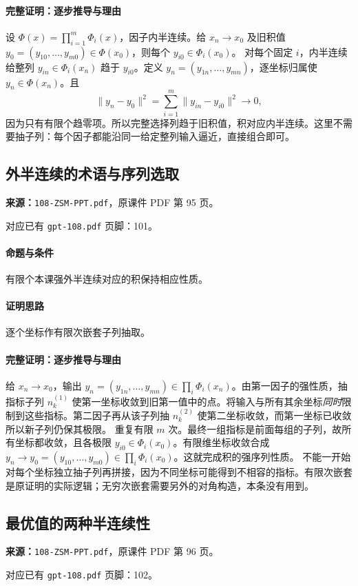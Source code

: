 \paragraph{完整证明：逐步推导与理由}

设 $\Phi(x)=\prod_{i=1}^m\Phi_i(x)$，因子内半连续。给 $x_n\to x_0$ 及旧积值 $y_0=(y_{10},\ldots,y_{m0})\in\Phi(x_0)$，则每个 $y_{i0}\in\Phi_i(x_0)$。
对每个固定 $i$，内半连续给整列 $y_{in}\in\Phi_i(x_n)$ 趋于 $y_{i0}$。定义 $y_n=(y_{1n},\ldots,y_{mn})$，逐坐标归属使 $y_n\in\Phi(x_n)$。且
\[\|y_n-y_0\|^2=\sum_{i=1}^m\|y_{in}-y_{i0}\|^2\to0,\]
因为只有有限个趋零项。所以完整选择列趋于旧积值，积对应内半连续。这里不需要抽子列：每个因子都能沿同一给定整列输入逼近，直接组合即可。

\clearpage\subsection{外半连续的术语与序列选取}
\textbf{来源：}\texttt{108-ZSM-PPT.pdf}，原课件 PDF 第 95 页。\par
对应已有 \texttt{gpt-108.pdf} 页脚：101。\par
\paragraph{命题与条件}有限个本课强外半连续对应的积保持相应性质。
\paragraph{证明思路}逐个坐标作有限次嵌套子列抽取。
\paragraph{完整证明：逐步推导与理由}

给 $x_n\to x_0$，输出 $y_n=(y_{1n},\ldots,y_{mn})\in\prod_i\Phi_i(x_n)$。由第一因子的强性质，抽指标子列 $n^{(1)}_k$ 使第一坐标收敛到旧第一值中的点。将输入与所有其余坐标\emph{同时}限制到这些指标。第二因子再从该子列抽 $n^{(2)}_k$ 使第二坐标收敛，而第一坐标已收敛所以新子列仍保其极限。
重复有限 $m$ 次。最终一组指标是前面每组的子列，故所有坐标都收敛，且各极限 $y_{i0}\in\Phi_i(x_0)$。有限维坐标收敛合成 $y_n\to y_0=(y_{10},\ldots,y_{m0})\in\prod_i\Phi_i(x_0)$。这就完成积的强序列性质。
不能一开始对每个坐标独立抽子列再拼接，因为不同坐标可能得到不相容的指标。有限次嵌套是原证明的实际逻辑；无穷次嵌套需要另外的对角构造，本条没有用到。

\clearpage\subsection{最优值的两种半连续性}
\textbf{来源：}\texttt{108-ZSM-PPT.pdf}，原课件 PDF 第 96 页。\par
对应已有 \texttt{gpt-108.pdf} 页脚：102。\par
